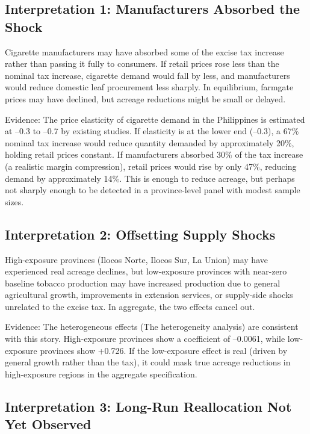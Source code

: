 \documentclass[12pt]{article}
\begin{document}
\subsection{Interpretation 1: Manufacturers Absorbed the Shock}

Cigarette manufacturers may have absorbed some of the excise tax increase rather than passing it fully to consumers. If retail prices rose less than the nominal tax increase, cigarette demand would fall by less, and manufacturers would reduce domestic leaf procurement less sharply. In equilibrium, farmgate prices may have declined, but acreage reductions might be small or delayed.

Evidence: The price elasticity of cigarette demand in the Philippines is estimated at --0.3 to --0.7 by existing studies. If elasticity is at the lower end (--0.3), a 67\% nominal tax increase would reduce quantity demanded by approximately 20\%, holding retail prices constant. If manufacturers absorbed 30\% of the tax increase (a realistic margin compression), retail prices would rise by only 47\%, reducing demand by approximately 14\%. This is enough to reduce acreage, but perhaps not sharply enough to be detected in a province-level panel with modest sample sizes.

\subsection{Interpretation 2: Offsetting Supply Shocks}

High-exposure provinces (Ilocos Norte, Ilocos Sur, La Union) may have experienced real acreage declines, but low-exposure provinces with near-zero baseline tobacco production may have increased production due to general agricultural growth, improvements in extension services, or supply-side shocks unrelated to the excise tax. In aggregate, the two effects cancel out.

Evidence: The heterogeneous effects (The heterogeneity analysis) are consistent with this story. High-exposure provinces show a coefficient of --0.0061, while low-exposure provinces show +0.726. If the low-exposure effect is real (driven by general growth rather than the tax), it could mask true acreage reductions in high-exposure regions in the aggregate specification.

\subsection{Interpretation 3: Long-Run Reallocation Not Yet Observed}
\end{document}
